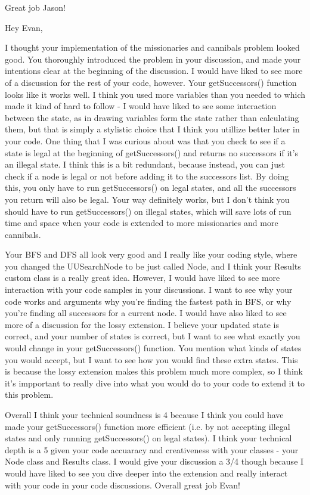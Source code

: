 Great job Jason! 

Hey Evan, 

I thought your implementation of the missionaries and cannibals problem looked good. You thoroughly introduced the problem in your discussion, and made your intentions clear at the beginning of the discussion. I would have liked to see more of a discussion for the rest of your code, however. Your getSuccessors() function looks like it works well. I think you used more variables than you needed to which made it kind of hard to follow - I would have liked to see some interaction between the state, as in drawing variables form the state rather than calculating them, but that is simply a stylistic choice that I think you utillize better later in your code. One thing that I was curious about was that you check to see if a state is legal at the beginning of getSuccessors() and returns no successors if it's an illegal state. I think this is a bit redundant, because instead, you can just check if a node is legal or not before adding it to the successors list. By doing this, you only have to run getSuccessors() on legal states, and all the successors you return will also be legal. Your way definitely works, but I don't think you should have to run getSuccessors() on illegal states, which will save lots of run time and space when your code is extended to more missionaries and more cannibals. 

Your BFS and DFS all look very good and I really like your coding style, where you changed the UUSearchNode to be just called Node, and I think your Results custom class is a really great idea. However, I would have liked to see more interaction with your code samples in your discussions. I want to see why your code works and arguments why you're finding the fastest path in BFS, or why you're finding all successors for a current node. I would have also liked to see more of a discussion for the lossy extension. I believe your updated state is correct, and your number of states is correct, but I want to see what exactly you would change in your getSuccessors() function. You mention what kinds of states you would accept, but I want to see how you would find these extra states. This is because the lossy extension makes this problem much more complex, so I think it's impportant to really dive into what you would do to your code to extend it to this problem. 

Overall I think your technical soundness is 4 because I think you could have made your getSuccessors() function more efficient (i.e. by not accepting illegal states and only running getSuccessors() on legal states). I think your technical depth is a 5 given your code accuaracy and creativeness with your classes - your Node class and Results class. I would give your discussion a 3/4 though because I would have liked to see you dive deeper into the extension and really interact with your code in your code discussions. Overall great job Evan!
